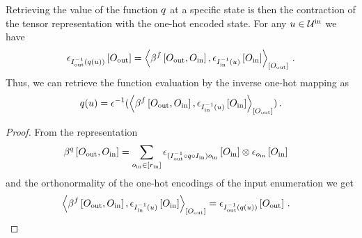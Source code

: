 \begin{theorem}
    \label{the:basisCalculus}
    Retrieving the value of the function $q$ at a specific state is then the contraction of the tensor representation with the one-hot encoded state.
    For any $u\in\mathcal{U}^{\mathrm{in}}$ we have
    \begin{align*}
        \onehotmapofat{\invindexinterpretationofat{\outsymbol}{\exfunctionat{\arbelement}}}{\indvariableof{\outsymbol}}
        = \contractionof{
            \bencodingofat{\exformula}{\indvariableof{\outsymbol},\indvariableof{\insymbol}},
            \onehotmapofat{\invindexinterpretationofat{\insymbol}{\arbelement}}{\indvariableof{\insymbol}}
        }{\indvariableof{\outsymbol}} \, .
    \end{align*}
    Thus, we can retrieve the function evaluation by the inverse one-hot mapping as
    \begin{align*}
        \exfunctionat{\arbelement} = \invonehotmapof{\contractionof{
            \bencodingofat{\exformula}{\indvariableof{\outsymbol},\indvariableof{\insymbol}},
            \onehotmapofat{\invindexinterpretationofat{\insymbol}{\arbelement}}{\indvariableof{\insymbol}}
        }{\indvariableof{\outsymbol}}} \, .
    \end{align*}
\end{theorem}
\begin{proof}
    From the representation
    \begin{align*}
        \bencodingofat{\exfunction}{\indvariableof{\outsymbol},\indvariableof{\insymbol}}
        & =  \sum_{\indindexofin{\insymbol}}
        \onehotmapofat{(\invindexinterpretationof{\outsymbol} \circ \exfunction \circ \indexinterpretationof{\insymbol}) \indindexof{\insymbol}
        }{\indvariableof{\insymbol}}
        \otimes
        \onehotmapofat{\indindexof{\insymbol}}{\indvariableof{\insymbol}}
    \end{align*}
    and the orthonormality of the one-hot encodings of the input enumeration we get
    \begin{align*}
        \contractionof{
            \bencodingofat{\exformula}{\indvariableof{\outsymbol},\indvariableof{\insymbol}},
            \onehotmapofat{\invindexinterpretationofat{\insymbol}{\arbelement}}{\indvariableof{\insymbol}}
        }{\indvariableof{\outsymbol}}
        = \onehotmapofat{\invindexinterpretationofat{\outsymbol}{\exfunctionat{\arbelement}}}{\indvariableof{\outsymbol}} \, . & \qedhere
    \end{align*}
\end{proof}

